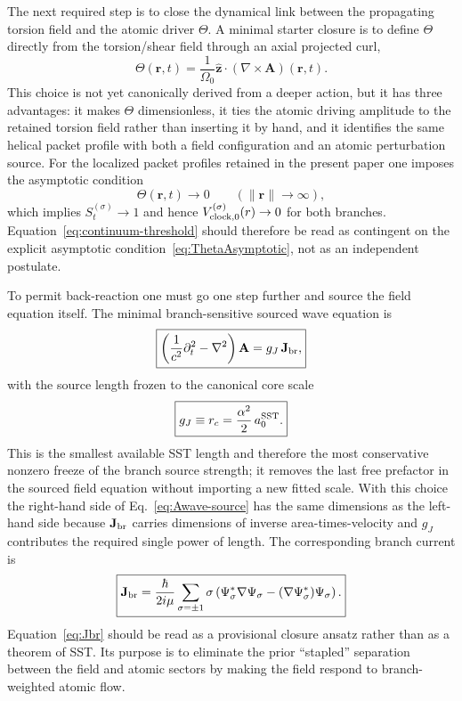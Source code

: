 \documentclass[11pt,a4paper]{article}
\begin{document}
The next required step is to close the dynamical link between the propagating torsion field and the atomic driver $\Theta$. A minimal starter closure is to define $\Theta$ directly from the torsion/shear field through an axial projected curl,
\begin{equation}
\label{eq:ThetaA}
\boxed{
\Theta(\mathbf r,t)
=
\frac{1}{\Omega_0}
\hat{\mathbf z}\cdot(\nabla\times \mathbf A)(\mathbf r,t).
}
\end{equation}
This choice is not yet canonically derived from a deeper action, but it has three advantages: it makes $\Theta$ dimensionless, it ties the atomic driving amplitude to the retained torsion field rather than inserting it by hand, and it identifies the same helical packet profile with both a field configuration and an atomic perturbation source. For the localized packet profiles retained in the present paper one imposes the asymptotic condition
\begin{equation}
\label{eq:ThetaAsymptotic}
\Theta(\mathbf r,t)\to 0 \qquad (\lVert \mathbf r\rVert\to\infty),
\end{equation}
which implies $S_t^{(\sigma)}\to 1$ and hence $V_{{\rm clock},0}^{(\sigma)}(r)\to 0$ for both branches. Equation~\eqref{eq:continuum-threshold} should therefore be read as contingent on the explicit asymptotic condition~\eqref{eq:ThetaAsymptotic}, not as an independent postulate.

To permit back-reaction one must go one step further and source the field equation itself. The minimal branch-sensitive sourced wave equation is
\begin{equation}
\label{eq:Awave-source}
\boxed{
\left(\frac{1}{c^2}\partial_t^2-\nabla^2\right)\mathbf A
=
g_J \,\mathbf J_{\rm br},
}
\end{equation}
with the source length frozen to the canonical core scale
\begin{equation}
\label{eq:gJfreeze}
\boxed{
 g_J \equiv r_c = \frac{\alpha^2}{2}\,a_0^{\rm SST}.
}
\end{equation}
This is the smallest available SST length and therefore the most conservative nonzero freeze of the branch source strength; it removes the last free prefactor in the sourced field equation without importing a new fitted scale. With this choice the right-hand side of Eq.~\eqref{eq:Awave-source} has the same dimensions as the left-hand side because $\mathbf J_{\rm br}$ carries dimensions of inverse area-times-velocity and $g_J$ contributes the required single power of length. The corresponding branch current is
\begin{equation}
\label{eq:Jbr}
\boxed{
\mathbf J_{\rm br}
=
\frac{\hbar}{2 i \mu}
\sum_{\sigma=\pm 1}
\sigma
\left(
\Psi_\sigma^*\nabla\Psi_\sigma
-
(\nabla\Psi_\sigma^*)\Psi_\sigma
\right).
}
\end{equation}
Equation~\eqref{eq:Jbr} should be read as a provisional closure ansatz rather than as a theorem of SST. Its purpose is to eliminate the prior ``stapled'' separation between the field and atomic sectors by making the field respond to branch-weighted atomic flow.
\end{document}
